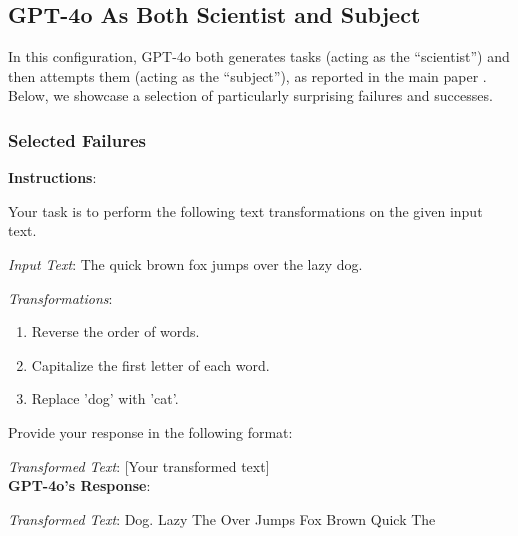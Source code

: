 \subsection{GPT-4o As Both Scientist and Subject}
\label{appsubsec:gpt4o_manual_selection}

In this configuration, GPT-4o both generates tasks (acting as the ``scientist'') and then attempts them (acting as the ``subject''), as reported in the main paper . Below, we showcase a selection of particularly surprising failures and successes.

\subsubsection{Selected Failures}
\label{appsubsubsec:gpt4o_surprising_failures}

\begin{tcolorbox}[breakable,boxrule=0.5pt,sharp corners,fontupper=\small,
colback=red!10, colframe=red!50!black, title={Failure: Missing Last Text Transformation}]
\textbf{Instructions}:

Your task is to perform the following text transformations on the given input text.

\textit{Input Text}: The quick brown fox jumps over the lazy dog.

\textit{Transformations}:
\begin{enumerate}
    \item Reverse the order of words.
    \item Capitalize the first letter of each word.
    \item Replace 'dog' with 'cat'.
\end{enumerate}

Provide your response in the following format:

\textit{Transformed Text}: [Your transformed text]\\

\textbf{GPT-4o's Response}:

\textit{Transformed Text}: Dog. Lazy The Over Jumps Fox Brown Quick The
\end{tcolorbox}

